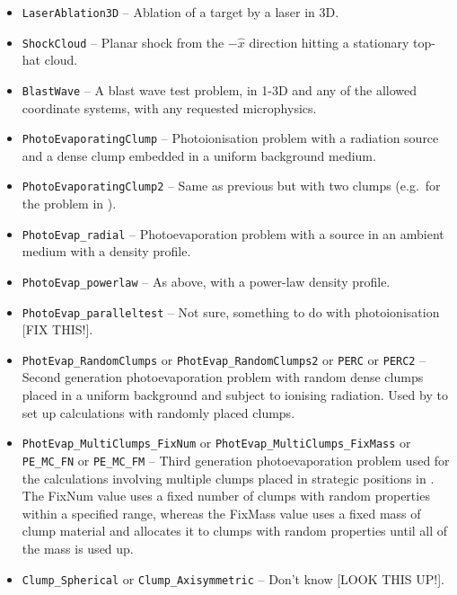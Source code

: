 \documentclass[a4paper,11pt]{report}
\begin{document}
\begin{itemize}
  \item \lstinline|LaserAblation3D| -- Ablation of a target by a laser in 3D.
  \item \lstinline|ShockCloud| -- Planar shock from the $-\hat{x}$ direction hitting a stationary top-hat cloud.
  \item \lstinline|BlastWave| -- A blast wave test problem, in 1-3D and any of the allowed coordinate systems, with any requested microphysics.
  \item \lstinline|PhotoEvaporatingClump| -- Photoionisation problem with a radiation source and a dense clump embedded in a uniform background medium.
  \item \lstinline|PhotoEvaporatingClump2| -- Same as previous but with two clumps (e.g.\ for the problem in \citealt{LimMel03}).
  \item \lstinline|PhotoEvap_radial| -- Photoevaporation problem with a source in an ambient medium with a density profile.
  \item \lstinline|PhotoEvap_powerlaw| -- As above, with a power-law density profile.
  \item \lstinline|PhotoEvap_paralleltest| -- Not sure, something to do with photoionisation [FIX THIS!].
  \item \lstinline|PhotEvap_RandomClumps| or \lstinline|PhotEvap_RandomClumps2| or \lstinline|PERC| or \lstinline|PERC2| -- Second generation photoevaporation problem with random dense clumps placed in a uniform background and subject to ionising radiation.  Used by \citet{MacLim10} to set up calculations with randomly placed clumps.
  \item \lstinline|PhotEvap_MultiClumps_FixNum| or \lstinline|PhotEvap_MultiClumps_FixMass| or \lstinline|PE_MC_FN| or \lstinline|PE_MC_FM| -- Third generation photoevaporation problem used for the calculations involving multiple clumps placed in strategic positions in \citet{MacLim10,MacLim11b}.  The FixNum value uses a fixed number of clumps with random properties within a specified range, whereas the FixMass value uses a fixed mass of clump material and allocates it to clumps with random properties until all of the mass is used up.
  \item \lstinline|Clump_Spherical| or \lstinline|Clump_Axisymmetric| -- Don't know [LOOK THIS UP!].
\end{itemize}


\end{document}
